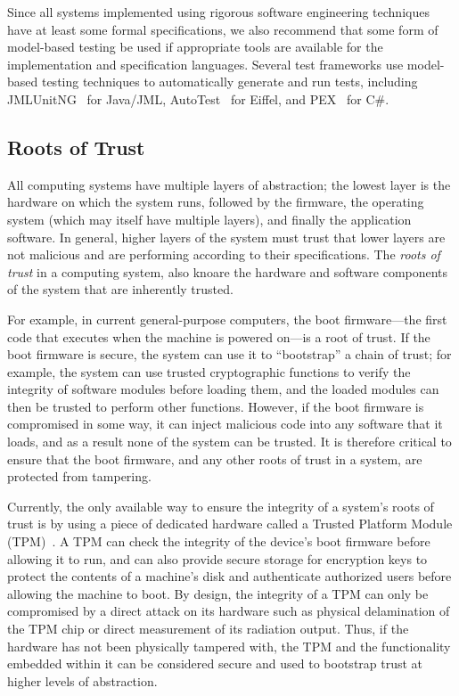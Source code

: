 Since all systems implemented using rigorous software engineering
techniques have at least some formal specifications, we also recommend
that some form of model-based testing be used if appropriate tools are
available for the implementation and specification languages. Several
test frameworks use model-based testing techniques to automatically
generate and run tests, including JMLUnitNG~\cite{ZimmermanNagmoti10}
for Java/JML, AutoTest~\cite{AutoTest10} for Eiffel, and
PEX~\cite{PEX08} for C\#.

\subsection{Roots of Trust}

All computing systems have multiple layers of abstraction; the lowest
layer is the hardware on which the system runs, followed by the
firmware, the operating system (which may itself have multiple
layers), and finally the application software. In general, higher
layers of the system must trust that lower layers are not malicious
and are performing according to their specifications. The \emph{roots
  of trust} in a computing system, also knoare the hardware and software
components of the system that are inherently trusted.

For example, in current general-purpose computers, the boot
firmware---the first code that executes when the machine is powered
on---is a root of trust. If the boot firmware is secure, the system
can use it to ``bootstrap'' a chain of trust; for example, the system
can use trusted cryptographic functions to verify the integrity of
software modules before loading them, and the loaded modules can then
be trusted to perform other functions. However, if the boot firmware
is compromised in some way, it can inject malicious code into any
software that it loads, and as a result none of the system can be
trusted. It is therefore critical to ensure that the boot firmware,
and any other roots of trust in a system, are protected from
tampering.

Currently, the only available way to ensure the integrity of a
system's roots of trust is by using a piece of dedicated hardware
called a Trusted Platform Module (TPM)~\cite{TPMSpec}. A TPM can check
the integrity of the device's boot firmware before allowing it to run,
and can also provide secure storage for encryption keys to protect the
contents of a machine's disk and authenticate authorized users before
allowing the machine to boot. By design, the integrity of a TPM can
only be compromised by a direct attack on its hardware such as
physical delamination of the TPM chip or direct measurement of its
radiation output. Thus, if the hardware has not been physically
tampered with, the TPM and the functionality embedded within it can be
considered secure and used to bootstrap trust at higher levels of
abstraction.


